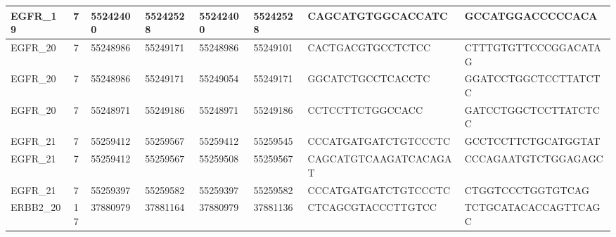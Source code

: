 \begin{landscape}
\begin{longtable}{| p{} | p{} | p{} | p{} | p{} | p{} | p{} | p{} |}
\multicolumn{1}{|l|}{EGFR\_19}   & \multicolumn{1}{c|}{7}  & \multicolumn{1}{l|}{55242400}  & \multicolumn{1}{l|}{55242528}  & \multicolumn{1}{l|}{55242400}  & \multicolumn{1}{l|}{55242528}  & \multicolumn{1}{l|}{CAGCATGTGGCACCATC}               & \multicolumn{1}{l|}{GCCATGGACCCCCACA}              \\ \hline
\multicolumn{1}{|l|}{EGFR\_20}   & \multicolumn{1}{c|}{7}  & \multicolumn{1}{l|}{55248986}  & \multicolumn{1}{l|}{55249171}  & \multicolumn{1}{l|}{55248986}  & \multicolumn{1}{l|}{55249101}  & \multicolumn{1}{l|}{CACTGACGTGCCTCTCC}               & \multicolumn{1}{l|}{CTTTGTGTTCCCGGACATAG}          \\ \hline
\multicolumn{1}{|l|}{EGFR\_20}   & \multicolumn{1}{c|}{7}  & \multicolumn{1}{l|}{55248986}  & \multicolumn{1}{l|}{55249171}  & \multicolumn{1}{l|}{55249054}  & \multicolumn{1}{l|}{55249171}  & \multicolumn{1}{l|}{GGCATCTGCCTCACCTC}               & \multicolumn{1}{l|}{GGATCCTGGCTCCTTATCTC}          \\ \hline
\multicolumn{1}{|l|}{EGFR\_20}   & \multicolumn{1}{c|}{7}  & \multicolumn{1}{l|}{55248971}  & \multicolumn{1}{l|}{55249186}  & \multicolumn{1}{l|}{55248971}  & \multicolumn{1}{l|}{55249186}  & \multicolumn{1}{l|}{CCTCCTTCTGGCCACC}                & \multicolumn{1}{l|}{GATCCTGGCTCCTTATCTCC}          \\ \hline
\multicolumn{1}{|l|}{EGFR\_21}   & \multicolumn{1}{c|}{7}  & \multicolumn{1}{l|}{55259412}  & \multicolumn{1}{l|}{55259567}  & \multicolumn{1}{l|}{55259412}  & \multicolumn{1}{l|}{55259545}  & \multicolumn{1}{l|}{CCCATGATGATCTGTCCCTC}            & \multicolumn{1}{l|}{GCCTCCTTCTGCATGGTAT}           \\ \hline
\multicolumn{1}{|l|}{EGFR\_21}   & \multicolumn{1}{c|}{7}  & \multicolumn{1}{l|}{55259412}  & \multicolumn{1}{l|}{55259567}  & \multicolumn{1}{l|}{55259508}  & \multicolumn{1}{l|}{55259567}  & \multicolumn{1}{l|}{CAGCATGTCAAGATCACAGAT}           & \multicolumn{1}{l|}{CCCAGAATGTCTGGAGAGC}           \\ \hline
\multicolumn{1}{|l|}{EGFR\_21}   & \multicolumn{1}{c|}{7}  & \multicolumn{1}{l|}{55259397}  & \multicolumn{1}{l|}{55259582}  & \multicolumn{1}{l|}{55259397}  & \multicolumn{1}{l|}{55259582}  & \multicolumn{1}{l|}{CCCATGATGATCTGTCCCTC}            & \multicolumn{1}{l|}{CTGGTCCCTGGTGTCAG}             \\ \hline
\multicolumn{1}{|l|}{ERBB2\_20}  & \multicolumn{1}{c|}{17} & \multicolumn{1}{l|}{37880979}  & \multicolumn{1}{l|}{37881164}  & \multicolumn{1}{l|}{37880979}  & \multicolumn{1}{l|}{37881136}  & \multicolumn{1}{l|}{CTCAGCGTACCCTTGTCC}              & \multicolumn{1}{l|}{TCTGCATACACCAGTTCAGC}          \\ \hline

\end{longtable}
\end{landscape}

